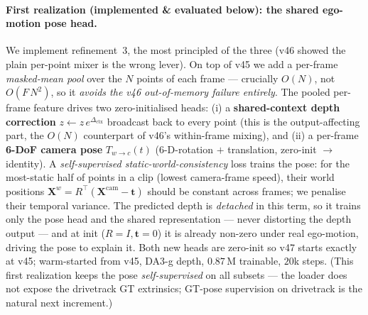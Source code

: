 \documentclass[11pt,a4paper]{article}
\begin{document}
\paragraph{First realization (implemented \& evaluated below): the shared ego-motion pose head.}
We implement refinement~3, the most principled of the three (v46 showed the plain per-point mixer is the
wrong lever). On top of v45 we add a per-frame \emph{masked-mean pool} over the $N$ points of each frame ---
crucially $O(N)$, not $O(F\,N^{2})$, so it \emph{avoids the v46 out-of-memory failure entirely}. The pooled
per-frame feature drives two zero-initialised heads: (i) a \textbf{shared-context depth correction}
$z\!\leftarrow\!z\,e^{\Delta_{\text{ctx}}}$ broadcast back to every point (this is the output-affecting part,
the $O(N)$ counterpart of v46's within-frame mixing), and (ii) a per-frame \textbf{6-DoF camera pose}
$T_{w\to c}(t)$ (6-D-rotation $+$ translation, zero-init $\to$ identity). A \emph{self-supervised
static-world-consistency} loss trains the pose: for the most-static half of points in a clip (lowest
camera-frame speed), their world positions $\mathbf{X}^{w}=R^{\top}(\mathbf{X}^{\text{cam}}-\mathbf{t})$
should be constant across frames; we penalise their temporal variance. The predicted depth is
\emph{detached} in this term, so it trains only the pose head and the shared representation --- never
distorting the depth output --- and at init ($R\!=\!I,\mathbf{t}\!=\!0$) it is already non-zero under real
ego-motion, driving the pose to explain it. Both new heads are zero-init so v47 starts exactly at v45;
warm-started from v45, DA3-g depth, $0.87$\,M trainable, $20$k steps. (This first realization keeps the pose
\emph{self-supervised} on all subsets --- the loader does not expose the drivetrack GT extrinsics; GT-pose
supervision on drivetrack is the natural next increment.)
\end{document}
